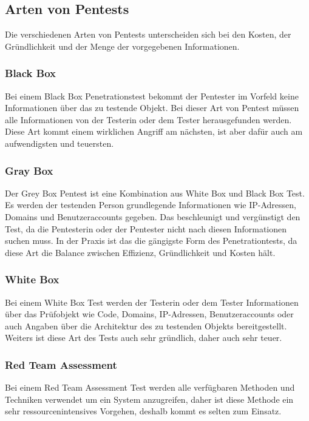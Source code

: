 \subsection{Arten von Pentests}

Die verschiedenen Arten von Pentests unterscheiden sich bei den Kosten, der Gründlichkeit und der Menge der vorgegebenen Informationen.

\subsubsection{Black Box}

Bei einem Black Box Penetrationstest bekommt der Pentester im Vorfeld keine Informationen über das zu testende Objekt. Bei dieser Art von Pentest müssen alle Informationen von der Testerin oder dem Tester herausgefunden werden. Diese Art kommt einem wirklichen Angriff am nächsten, ist aber dafür auch am aufwendigsten und teuersten.

\subsubsection{Gray Box}

Der Grey Box Pentest ist eine Kombination aus White Box und Black Box Test. Es werden der testenden Person grundlegende Informationen wie IP-Adressen, Domains und Benutzeraccounts gegeben. Das beschleunigt und vergünstigt den Test, da die Pentesterin oder der Pentester nicht nach diesen Informationen suchen muss. In der Praxis ist das die gängigste Form des Penetrationtests, da diese Art die Balance zwischen Effizienz, Gründlichkeit und Kosten hält.

\subsubsection{White Box}

Bei einem White Box Test werden der Testerin oder dem Tester Informationen über das Prüfobjekt wie Code, Domains, IP-Adressen, Benutzeraccounts oder auch Angaben über die Architektur des zu testenden Objekts bereitgestellt. Weiters ist diese Art des Tests auch sehr gründlich, daher auch sehr teuer. 

\subsubsection{Red Team Assessment}

Bei einem Red Team Assessment Test werden alle verfügbaren Methoden und Techniken verwendet um ein System anzugreifen, daher ist diese Methode ein sehr ressourcenintensives Vorgehen, deshalb kommt es selten zum Einsatz.

